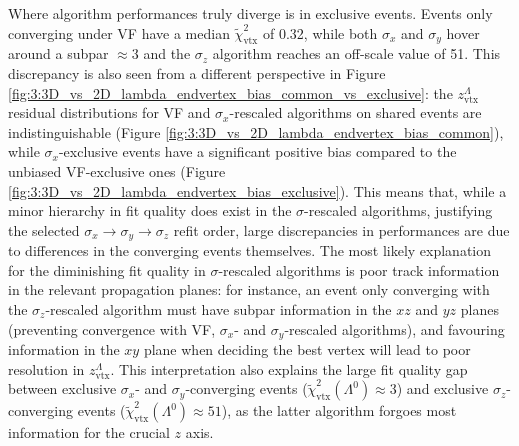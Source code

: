 Where algorithm performances truly diverge is in exclusive events.
Events only converging under VF have a median $\tilde{\chi}^2_\text{vtx}$ of 0.32, while both $\sigma_x$ and $\sigma_y$ hover around a subpar $\approx 3$ and the $\sigma_z$ algorithm reaches an off-scale value of 51.
This discrepancy is also seen from a different perspective in Figure \ref{fig:3:3D_vs_2D_lambda_endvertex_bias_common_vs_exclusive}: the $z_\text{vtx}^\Lambda$ residual distributions for VF and $\sigma_x$-rescaled algorithms on shared events are indistinguishable (Figure \ref{fig:3:3D_vs_2D_lambda_endvertex_bias_common}), while $\sigma_x$-exclusive events have a significant positive bias compared to the unbiased VF-exclusive ones (Figure \ref{fig:3:3D_vs_2D_lambda_endvertex_bias_exclusive}).
This means that, while a minor hierarchy in fit quality does exist in the $\sigma$-rescaled algorithms, justifying the selected $\sigma_x \rightarrow \sigma_y \rightarrow \sigma_z$ refit order, large discrepancies in performances are due to differences in the converging events themselves.
The most likely explanation for the diminishing fit quality in $\sigma$-rescaled algorithms is poor track information in the relevant propagation planes:
for instance, an event only converging with the $\sigma_z$-rescaled algorithm must have subpar information in the $xz$ and $yz$ planes (preventing convergence with VF, $\sigma_x$- and $\sigma_y$-rescaled algorithms), and favouring information in the $xy$ plane when deciding the best vertex will lead to poor resolution in $z_\text{vtx}^\Lambda$.
This interpretation also explains the large fit quality gap between exclusive $\sigma_x$- and $\sigma_y$-converging events ($\tilde{\chi}^2_\text{vtx} (\Lambda^0) \approx 3$) and exclusive $\sigma_z$-converging events ($\tilde{\chi}^2_\text{vtx} (\Lambda^0) \approx 51$), as the latter algorithm forgoes most information for the crucial $z$ axis.

